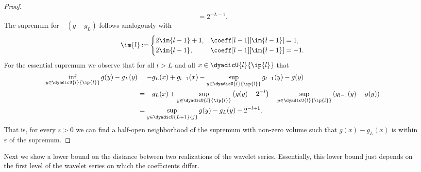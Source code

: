 \documentclass[twoside,11pt]{article}
\newcommand{\defeq}{\mathbin{:=}}
\begin{document}
\begin{proof}
\begin{align}
        =2^{-L-1}.
    \end{align}
    The supremum for $-(g-g_L)$ follows analogously with
    \begin{align}
        \im{l}\defeq
        \begin{cases}
            2\im{l-1}+1,&\coeff[l-1][\im{l-1}]=1,\\
            2\im{l-1},&\coeff[l-1][\im{l-1}]=-1.
        \end{cases}
    \end{align}
    For the essential supremum we observe that for all $l>L$ and all $x\in\dyadicU{l}{\ip{l}}$ that
    \begin{align}
        \inf_{y\in\dyadicU{l}{\ip{l}}}g(y)-g_L(y)
        &=
        -g_L(x)+g_{l-1}(x)-\sup_{y\in\dyadicU{l}{\ip{l}}}g_{l-1}(y)-g(y)
        \\&
        =
        -g_L(x)
        +\sup_{y\in\dyadicU{l}{\ip{l}}}\big(g(y)-2^{-l}\big)
        -\sup_{y\in\dyadicU{l}{\ip{l}}}\left(g_{l-1}(y)-g(y)\right)
        \\&
        =
        \sup_{y\in\dyadicU{L+1}{j}}g(y)
        -g_L(y)
        -2^{-l+1}.
    \end{align}
    That is, for every $\varepsilon>0$ we can find a half-open neighborhood of the supremum with non-zero volume such that $g(x)-g_L(x)$ is within $\varepsilon$ of the supremum.
\end{proof}


Next we show a lower bound on the distance between two realizations of the wavelet series.
Essentially, this lower bound just depends on the first level of the wavelet series on which the coefficients differ.
\end{document}
